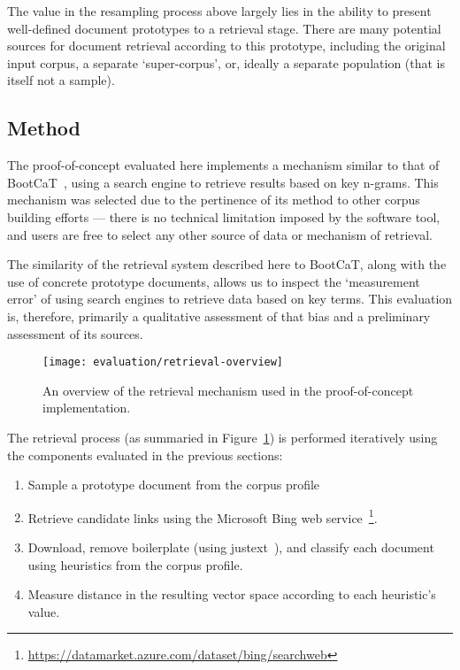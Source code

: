 The value in the resampling process above largely lies in the ability to present well-defined document prototypes to a retrieval stage.  There are many potential sources for document retrieval according to this prototype, including the original input corpus, a separate `super-corpus', or, ideally a separate population (that is itself not a sample).



\subsection{Method}
\label{sec:evaluation:method}

The proof-of-concept evaluated here implements a mechanism similar to that of BootCaT~\cite{baroni2004bootcat}, using a search engine to retrieve results based on key n-grams.  This mechanism was selected due to the pertinence of its method to other corpus building efforts --- there is no technical limitation imposed by the software tool, and users are free to select any other source of data or mechanism of retrieval.

The similarity of the retrieval system described here to BootCaT, along with the use of concrete prototype documents, allows us to inspect the `measurement error' of using search engines to retrieve data based on key terms.  This evaluation is, therefore, primarily a qualitative assessment of that bias and a preliminary assessment of its sources.


\begin{figure}[Ht]
    \centering
    \texttt{[image: evaluation/retrieval-overview]}
    \caption{An overview of the retrieval mechanism used in the proof-of-concept implementation.}
    \label{fig:evaluation:retrieval:outline}
\end{figure}


The retrieval process (as summaried in Figure~\ref{fig:evaluation:retrieval:outline}) is performed iteratively using the components evaluated in the previous sections:

\begin{enumerate}
    \item Sample a prototype document from the corpus profile
    \item Retrieve candidate links using the Microsoft Bing web service~\footnote{\url{https://datamarket.azure.com/dataset/bing/searchweb}}.
    \item Download, remove boilerplate (using justext~\cite{pomikalek2013justext}), and classify each document using heuristics from the corpus profile.
    \item Measure distance in the resulting vector space according to each heuristic's value.
\end{enumerate}

